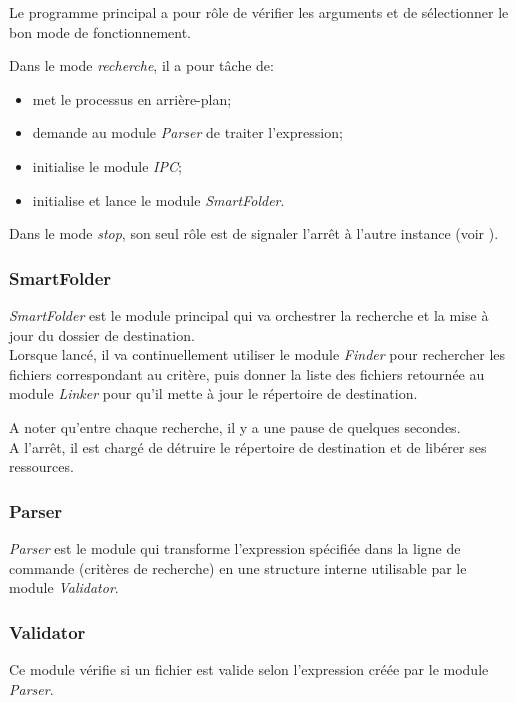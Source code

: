 \documentclass[11pt, a4paper]{article}
\begin{document}
Le programme principal a pour rôle de vérifier les arguments et de sélectionner le bon mode de fonctionnement.

Dans le mode \textit{recherche}, il a pour tâche de:
\begin{itemize}
    \item met le processus en arrière-plan;
    \item demande au module \textit{Parser} de traiter l'expression;
    \item initialise le module \textit{IPC};
    \item initialise et lance le module \textit{SmartFolder}.\\
\end{itemize}

Dans le mode \textit{stop}, son seul rôle est de signaler l'arrêt à l'autre instance (voir ).

\subsubsection{SmartFolder}
\textit{SmartFolder} est le module principal qui va orchestrer la recherche et la mise à jour du dossier de destination. \\

Lorsque lancé, il va continuellement utiliser le module \textit{Finder} pour rechercher les fichiers correspondant au critère,
puis donner la liste des fichiers retournée au module \textit{Linker} pour qu'il mette à jour le répertoire de destination.

A noter qu'entre chaque recherche, il y a une pause de quelques secondes. \\

A l'arrêt, il est chargé de détruire le répertoire de destination et de libérer ses ressources.

\subsubsection{Parser}
\textit{Parser} est le module qui transforme
l'expression spécifiée dans la ligne de commande (critères de recherche) en une structure interne utilisable par le module \textit{Validator}.

\subsubsection{Validator}
Ce module vérifie si un fichier est valide selon l'expression créée par le module \textit{Parser}.
\end{document}
